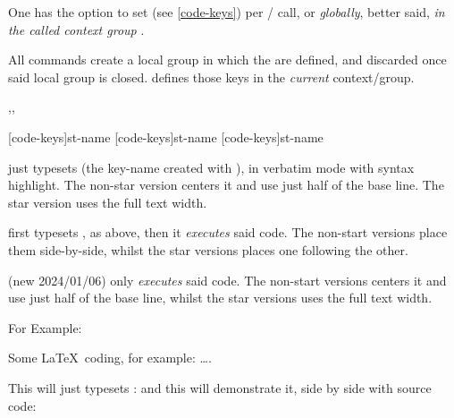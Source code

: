\documentclass{article}
\begin{document}
\begin{codedescribe}{\setcodekeys}
	\begin{codesyntax}%
	\end{codesyntax}

One has the option to set  (see \ref{code-keys}) per \tsmacro{\tscode}{}/\tsmacro{\tsdemo}{} call, or \emph{globally}, better said, \emph{in the called context group} .\\
\begin{tsremark}[N.B.:]
All \tsobj[code]{\tscode,\tsdemo} commands create a local group  in which the  are defined, and discarded once said local group is closed. \tsmacro{\setcodekeys}{} defines those keys in the \emph{current} context/group.
\end{tsremark}
\end{codedescribe}

\begin{codedescribe}[code,update=2024/01/06]{\tscode*,\tsdemo*,\tsresult*}
	\begin{codesyntax}%
		\tsmacro{\tscode*}[code-keys]{st-name}
		\tsmacro{\tsdemo*}[code-keys]{st-name}
		\tsmacro{\tsresult*}[code-keys]{st-name}
	\end{codesyntax}
\tsmacro{\tscode}{} just typesets  (the key-name created with ), in verbatim mode with syntax highlight. The non-star version centers it and use just half of the base line. The star version uses the full text width.

\tsmacro{\tsdemo*}{} first typesets , as above, then it \emph{executes} said code. The non-start versions place them side-by-side, whilst the star versions places one following the other.

(new 2024/01/06) \tsmacro{\tsresult*}{} only \emph{executes} said code. The non-start versions centers it and use just half of the base line, whilst the star versions uses the full text width.

\end{codedescribe}


For Example:

\begin{codestore}[st=democodestore]
\begin{codestore}[stmeta]
		Some \LaTeX~coding, for example: \ldots.
\end{codestore}  
This will just typesets :
and this will demonstrate it, side by side with source code:
\end{codestore}
\end{document}
